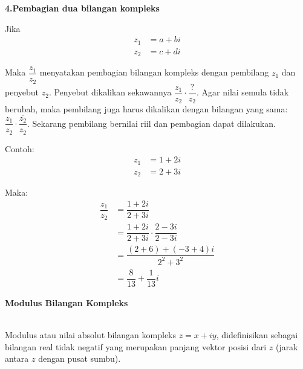\documentclass{article}
\begin{document}
    \textbf{4.\>Pembagian dua bilangan kompleks\\}
    
    Jika
    \begin{align}
        z_1 &= a + bi
        \nonumber\\
        z_2 &= c + di
        \nonumber
    \end{align}
    
    Maka $\dfrac{z_1}{z_2}$ menyatakan pembagian bilangan kompleks dengan pembilang $z_1$ dan penyebut $z_2$. Penyebut dikalikan sekawannya $\dfrac{z_1}{z_2} \cdot \dfrac{?}{z_2}$. Agar nilai semula tidak berubah, maka pembilang juga harus dikalikan dengan bilangan yang sama: $\dfrac{z_1}{z_2} \cdot \dfrac{\overline{z_2}}{z_2}$. Sekarang pembilang bernilai riil dan pembagian dapat dilakukan.

    Contoh: 
    \begin{align}
        z_1 &= 1 + 2i
        \nonumber\\
        z_2 &= 2 + 3i
        \nonumber 
    \end{align}

    Maka:
    \begin{align}
        \dfrac{z_1}{z_2}    &= \dfrac{1+2i}{2+3i}
                            \nonumber\\
                            &= \dfrac{1+2i}{2+3i} \cdot \dfrac{2-3i}{2-3i}
                            \nonumber\\
                            &= \dfrac{(2+6)+(-3+4)i}{2^2+3^2}
                            \nonumber\\
                            &= \dfrac{8}{13} + \dfrac{1}{13}i
                            \nonumber
    \end{align}


    \newpage
    \begin{center}
        \textbf{Modulus Bilangan Kompleks}
    \end{center}
    \leavevmode\\

    Modulus atau nilai absolut bilangan kompleks $ z = x + iy $, didefinisikan sebagai bilangan real tidak negatif yang merupakan panjang vektor posisi dari $z$ (jarak antara $z$ dengan pusat sumbu).
    \\ \\

    \\ \\
\end{document}
